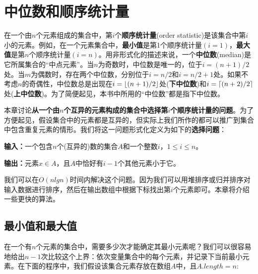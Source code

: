 \documentclass[a4paper,11pt]{ctexbook}
\begin{document}
\setcounter{chapter}{8}
\chapter{中位数和顺序统计量}
在一个由$n$个元素组成的集合中，第$ i $个\textbf{顺序统计量}(order statistic)是该集合中第$ i $小的元素。例如，在一个元素集合中，\textbf{最小值}是第1个顺序统计量$ (i = 1) $，\textbf{最大值}是第$ n $个顺序统计量$ (i=n)$。用非形式化的描述来说，一个\textbf{中位数}(median)是它所属集合的“中点元素”。当$ n $为奇数时，中位数是唯一的，位于$ i = (n+1)/2 $处。当$ m $为偶数时，存在两个中位数，分别位于$ i=n/2 $和$ i=n/2+1 $处。如果不考虑$ n $的奇偶性，中位数总是出现在$ i=\left\lfloor (n+1)/2 \right\rfloor $处(\textbf{下中位数})和$ i=\lceil (n+2)/2 \rceil $处(\textbf{上中位数})。为了简便起见，本书中所用的“中位数”都是指下中位数。

本章讨论\textbf{从一个由$ n $个互异的元素构成的集合中选择第$ i $个顺序统计量的问题}。为了方便起见，假设集合中的元素都是互异的，但实际上我们所作的都可以推广到集合中包含重复元素的情形。我们将这一问题形式化定义为如下的\textbf{选择问题}：

\textbf{输入：}一个包含$ n $个(互异的)数的集合$ A $和一个整数$ i $，$ 1\leq i \leq n $。

\textbf{输出：}元素$ x \in A $，且$ A $中恰好有$ i-1 $个其他元素小于它。

我们可以在$ O(nlgn) $时间内解决这个问题。因为我们可以用堆排序或归并排序对输入数据进行排序，然后在输出数组中根据下标找出第$ i $个元素即可。本章将介绍一些更快的算法。
\section{最小值和最大值}
在一个有$ n $个元素的集合中，需要多少次才能确定其最小元素呢？我们可以很容易地给出$ n-1 $次比较这个上界：依次变量集合中的每个元素，并记录下当前最小元素。在下面的程序中，我们假设该集合元素存放在数组$ A $中，且$ A.length=n $:
\begin{codebox}
\end{codebox}
\end{document}
